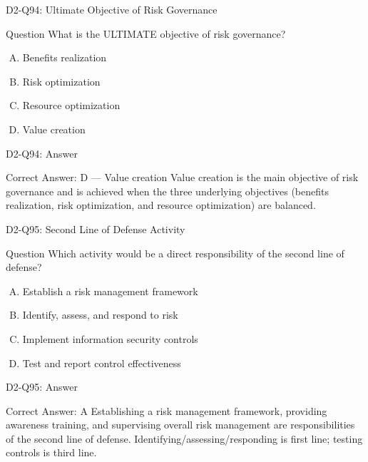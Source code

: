 \documentclass{beamer}
\begin{document}
	\begin{frame}{D2-Q94: Ultimate Objective of Risk Governance}
		\begin{block}{Question}
			What is the ULTIMATE objective of risk governance?
		\end{block}
		\begin{enumerate}[(A)]
			\item Benefits realization
			\item Risk optimization
			\item Resource optimization
			\item Value creation
		\end{enumerate}
	\end{frame}
	\begin{frame}{D2-Q94: Answer}
		\begin{block}{Correct Answer: D --- Value creation}
			Value creation is the main objective of risk governance and is achieved when the three underlying objectives (benefits realization, risk optimization, and resource optimization) are balanced.
		\end{block}
	\end{frame}
	
	\begin{frame}{D2-Q95: Second Line of Defense Activity}
		\begin{block}{Question}
			Which activity would be a direct responsibility of the second line of defense?
		\end{block}
		\begin{enumerate}[(A)]
			\item Establish a risk management framework
			\item Identify, assess, and respond to risk
			\item Implement information security controls
			\item Test and report control effectiveness
		\end{enumerate}
	\end{frame}
	\begin{frame}{D2-Q95: Answer}
		\begin{block}{Correct Answer: A}
			Establishing a risk management framework, providing awareness training, and supervising overall risk management are responsibilities of the second line of defense. Identifying/assessing/responding is first line; testing controls is third line.
		\end{block}
	\end{frame}
	
\end{document}
